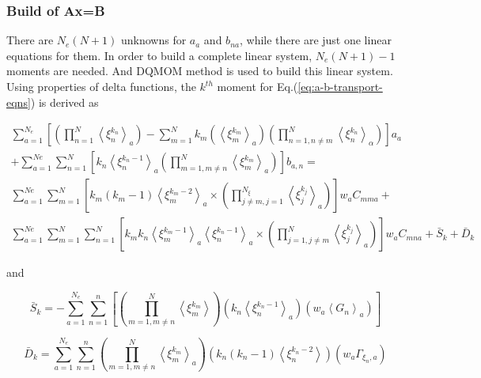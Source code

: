\subsubsection{Build of Ax=B}\label{subsubsec:buildAX=B}
There are $N_e(N+1)$ unknowns for $a_a$ and $b_{na}$, while there
are just one linear equations for them. In order to build a complete
linear system, $N_e(N+1)-1$ moments are needed. And DQMOM method
is used to build this linear system. Using properties of delta functions,
the $k^{th}$ moment for Eq.(\ref{eq:a-b-transport-eqns}) is derived
as



\begin{equation}
\begin{split}
\sum_{a=1}^{N_{e}}\left[\left(\prod_{n=1}^{N}\left<\xi_{n}^{k_n}\right>_{a}\right)-\sum_{m=1}^{N}k_m\left(\left<\xi_{m}^{k_m}\right>_{a}\right)\left(\prod_{n=1,n\neq m}^{N}\left<\xi_{n}^{k_n}\right>_\alpha\right)\right]a_{a}
\\
+\sum_{a=1}^{Ne}\sum_{n=1}^{N}\left[k_n\left<\xi_{n}^{k_n-1}\right>_{a}\left(\prod_{m=1,m\neq n}^{N}\left<\xi_{m}^{k_m}\right>_{a}\right)\right]b_{a,n}=
\\
\sum_{a=1}^{Ne}\sum_{m=1}^{N}\left[k_m\left(k_m-1\right)\left<\xi_m^{k_m-2}\right>_a\times\left(\prod_{j \neq m,j=1}^{N_\xi}\left<\xi_j^{k_j}\right>_a\right)\right]{w}_a{C}_{mma}+
\\ \sum_{a=1}^{Ne}\sum_{m=1}^{N}\sum_{n=1}^{N}\left[k_mk_n\left<\xi_{m}^{k_m-1}\right>_{a}\left<\xi_n^{k_n-1}\right>_a\times\left(\prod_{j=1,j \neq m}^{N}\left<\xi_{j}^{k_j}\right>_{a}\right)\right]w_{a}C_{mna}+\bar{S}_{k}+\bar{D}_{k}
\end{split}
\label{eq:kth_moment}
\end{equation}

and

\begin{equation}
\bar{S}_{k}=-\sum_{a=1}^{N_{e}}\sum_{n=1}^{n}\left[\left(\prod_{m=1,m\neq n}^{N}\left<\xi_{m}^{k_{m}}\right>\right)\left(k_{n}\left<\xi_{n}^{k_{n}-1}\right>_{a}\right)\left(w_{a}\left<G_{n}\right>_{a}\right)\right]
\end{equation}


\begin{equation}
\bar{D}_{k}=\sum_{a=1}^{N_{e}}\sum_{n=1}^{n}\left(\prod_{m=1,m\neq n}^{N}\left<\xi_{m}^{k_{m}}\right>_{a}\right)\left(k_{n}\left(k_{n}-1\right)\left<\xi_{n}^{k_{n}-2}\right>\right)\left(w_{a}\Gamma_{\xi_{n},a}\right)\label{eq:Dk_bar}
\end{equation}


